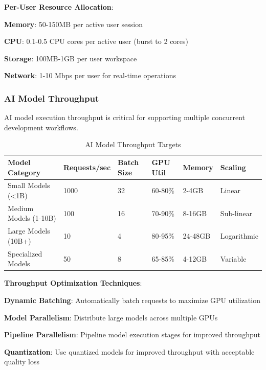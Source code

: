 \textbf{Per-User Resource Allocation}:
\begin{compactlist}
    \item \textbf{Memory}: 50-150MB per active user session
    \item \textbf{CPU}: 0.1-0.5 CPU cores per active user (burst to 2 cores)
    \item \textbf{Storage}: 100MB-1GB per user workspace
    \item \textbf{Network}: 1-10 Mbps per user for real-time operations
\end{compactlist}

\subsubsection*{AI Model Throughput}

AI model execution throughput is critical for supporting multiple concurrent development workflows.

\begin{table}[h]
\centering
\caption{AI Model Throughput Targets}
\label{tab:ai-throughput}
\begin{tabular}{@{}llllll@{}}
\toprule
\textbf{Model Category} & \textbf{Requests/sec} & \textbf{Batch Size} & \textbf{GPU Util} & \textbf{Memory} & \textbf{Scaling} \\
\midrule
Small Models (<1B) & 1000 & 32 & 60-80\% & 2-4GB & Linear \\
Medium Models (1-10B) & 100 & 16 & 70-90\% & 8-16GB & Sub-linear \\
Large Models (10B+) & 10 & 4 & 80-95\% & 24-48GB & Logarithmic \\
Specialized Models & 50 & 8 & 65-85\% & 4-12GB & Variable \\
\bottomrule
\end{tabular}
\end{table}

\textbf{Throughput Optimization Techniques}:
\begin{compactlist}
    \item \textbf{Dynamic Batching}: Automatically batch requests to maximize GPU utilization
    \item \textbf{Model Parallelism}: Distribute large models across multiple GPUs
    \item \textbf{Pipeline Parallelism}: Pipeline model execution stages for improved throughput
    \item \textbf{Quantization}: Use quantized models for improved throughput with acceptable quality loss
\end{compactlist}

